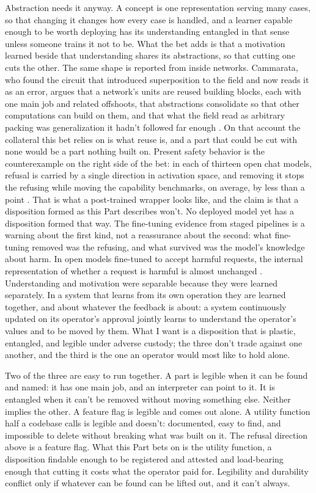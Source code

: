 Abstraction needs it anyway. A concept is one representation serving many cases, so that changing it changes how every case is handled, and a learner capable enough to be worth deploying has its understanding entangled in that sense unless someone trains it not to be. What the bet adds is that a motivation learned beside that understanding shares its abstractions, so that cutting one cuts the other. The same shape is reported from inside networks. Cammarata, who found the circuit that introduced superposition to the field and now reads it as an error, argues that a network's units are reused building blocks, each with one main job and related offshoots, that abstractions consolidate so that other computations can build on them, and that what the field read as arbitrary packing was generalization it hadn't followed far enough \autocite{cammarata2026clean}. On that account the collateral this bet relies on is what reuse is, and a part that could be cut with none would be a part nothing built on. Present safety behavior is the counterexample on the right side of the bet: in each of thirteen open chat models, refusal is carried by a single direction in activation space, and removing it stops the refusing while moving the capability benchmarks, on average, by less than a point \autocite{arditi2024refusal}. That is what a post-trained wrapper looks like, and the claim is that a disposition formed as this Part describes won't. No deployed model yet has a disposition formed that way. The fine-tuning evidence from staged pipelines is a warning about the first kind, not a reassurance about the second: what fine-tuning removed was the refusing, and what survived was the model's knowledge about harm. In open models fine-tuned to accept harmful requests, the internal representation of whether a request is harmful is almost unchanged \autocite{jain2024mechanistically,zhao2025harmfulness}. Understanding and motivation were separable because they were learned separately. In a system that learns from its own operation they are learned together, and about whatever the feedback is about: a system continuously updated on its operator's approval jointly learns to understand the operator's values and to be moved by them. What I want is a disposition that is plastic, entangled, and legible under adverse custody; the three don't trade against one another, and the third is the one an operator would most like to hold alone.

Two of the three are easy to run together. A part is legible when it can be found and named: it has one main job, and an interpreter can point to it. It is entangled when it can't be removed without moving something else. Neither implies the other. A feature flag is legible and comes out alone. A utility function half a codebase calls is legible and doesn't: documented, easy to find, and impossible to delete without breaking what was built on it. The refusal direction above is a feature flag. What this Part bets on is the utility function, a disposition findable enough to be registered and attested and load-bearing enough that cutting it costs what the operator paid for. Legibility and durability conflict only if whatever can be found can be lifted out, and it can't always.

